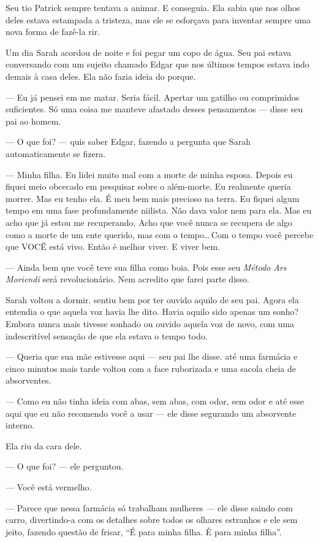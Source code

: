 Seu tio Patrick sempre tentava a animar. E conseguia. Ela sabia que nos olhos deles estava estampada a tristeza, mas ele se esforçava para inventar sempre uma nova forma de fazê-la rir.

Um dia Sarah acordou de noite e foi pegar um copo de água. Seu pai estava conversando com um sujeito chamado Edgar que nos últimos tempos estava indo demais à casa deles. Ela não fazia ideia do porque.

--- Eu já pensei em me matar. Seria fácil. Apertar um gatilho ou comprimidos suficientes. Só uma coisa me manteve afastado desses pensamentos --- disse seu pai ao homem.

--- O que foi? --- quis saber Edgar, fazendo a pergunta que Sarah automaticamente se fizera.

--- Minha filha. Eu lidei muito mal com a morte de minha esposa. Depois eu fiquei meio obcecado em pesquisar sobre o além-morte. Eu realmente queria morrer. Mas eu tenho ela. É meu bem mais precioso na terra. Eu fiquei algum tempo em uma fase profundamente niilista. Não dava valor nem para ela. Mas eu acho que já estou me recuperando. Acho que você nunca se recupera de algo como a morte de um ente querido, mas com o tempo\ldots\,Com o tempo você percebe que VOCÊ está vivo. Então é melhor viver. E viver bem.

--- Ainda bem que você teve sua filha como boia. Pois esse seu \emph{Método Ars Moriendi} será revolucionário. Nem acredito que farei parte disso.

Sarah voltou a dormir.  sentiu bem por ter ouvido aquilo de seu pai. Agora ela entendia o que aquela voz havia lhe dito. Havia aquilo sido apenas um sonho? Embora nunca mais tivesse sonhado ou ouvido aquela voz de novo,  com uma indescritível sensação de que ela estava  o tempo todo.

--- Queria que sua mãe estivesse aqui --- seu pai lhe disse.  até uma farmácia e cinco minutos mais tarde voltou com a face ruborizada e uma sacola cheia de absorventes.

--- Como eu não tinha ideia com abas, sem abas, com odor, sem odor e até esse aqui que eu não recomendo você a usar --- ele disse segurando um absorvente interno.

Ela riu da cara dele.

--- O que foi? --- ele perguntou.

--- Você está vermelho.

--- Parece que nessa farmácia só trabalham mulheres ---  ele disse\mudanca{,} saindo com carro, divertindo-a com os detalhes sobre todos os olhares estranhos e ele sem jeito, fazendo questão de frisar, ``É para minha filha. É para minha filha''.

